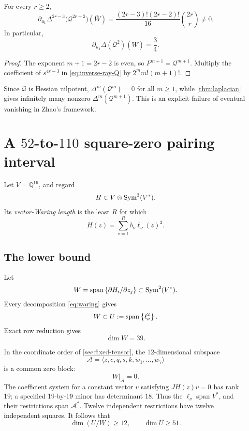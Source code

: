 \documentclass[11pt,reqno]{amsart}
\begin{document}
\begin{theorem}
\label{thm:laplacian}
For every \(r\ge2\),
\[
\partial_{u_1}\Delta^{2r-3}
\bigl(\mathcal Q^{2r-2}\bigr)(\bar W)
=
\frac{(2r-3)!(2r-2)!}{16}\binom{2r}{r}\ne0.
\]
In particular,
\[
\partial_{u_1}\Delta(\mathcal Q^2)(\bar W)=\frac34.
\]
\end{theorem}

\begin{proof}
The exponent \(m+1=2r-2\) is even, so
\(P^{m+1}=\mathcal Q^{m+1}\).  Multiply the coefficient of
\(s^{4r-3}\) in \eqref{eq:inverse-ray-Q} by
\(2^m m!(m+1)!\).
\end{proof}

Since \(\mathcal Q\) is Hessian nilpotent,
\(\Delta^m(\mathcal Q^m)=0\) for all \(m\ge1\), while
\cref{thm:laplacian} gives infinitely many nonzero
\(\Delta^m(\mathcal Q^{m+1})\).  This is an explicit failure of eventual
vanishing in Zhao's framework.

\section{A \texorpdfstring{\(52\)-to-\(110\)}{52-to-110}
square-zero pairing interval}
\label{sec:pairing}

Let \(V=\mathbb Q^{19}\), and regard
\[
H\in V\otimes\operatorname{Sym}^3(V^*).
\]
Its \emph{vector-Waring length} is the least \(R\) for which
\begin{equation}
\label{eq:waring}
H(z)=\sum_{\nu=1}^R b_\nu\ell_\nu(z)^3.
\end{equation}

\subsection{The lower bound}

Let
\[
W=\operatorname{span}\left\{
\partial H_i/\partial z_j
\right\}\subset\operatorname{Sym}^2(V^*).
\]
Every decomposition \eqref{eq:waring} gives
\[
W\subset U:=\operatorname{span}\left\{\ell_\nu^2\right\}.
\]
Exact row reduction gives
\begin{equation}
\label{eq:dimW}
\dim W=39.
\end{equation}

In the coordinate order of \cref{sec:fixed-tensor}, the 12-dimensional
subspace
\[
\mathcal A=
\langle z,c,q,s,k,w_1,\ldots,w_7\rangle
\]
is a common zero block:
\[
W|_{\mathcal A}=0.
\]
The coefficient system for a constant vector \(v\) satisfying
\(JH(z)v=0\) has rank 19; a specified 19-by-19 minor has determinant 18.
Thus the \(\ell_\nu\) span \(V^*\), and their restrictions span
\(\mathcal A^*\).  Twelve independent restrictions have twelve independent
squares.  It follows that
\[
\dim(U/W)\ge12,\qquad \dim U\ge51.
\]
\end{document}

